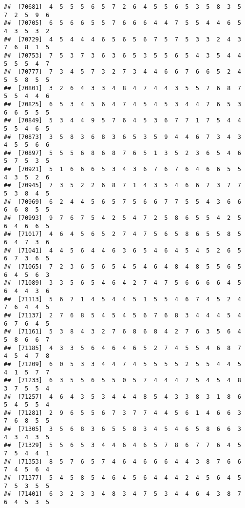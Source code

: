 \documentclass[
]{book}
\begin{document}
\begin{verbatim}
##  [70681]  4  5  5  5  6  5  7  2  6  4  5  5  6  5  3  5  8  3  5  7  2  5  9  6
##  [70705]  6  5  6  6  5  5  7  6  6  6  4  4  7  5  5  4  4  6  5  4  3  5  3  2
##  [70729]  4  5  4  4  4  6  5  6  5  6  7  5  7  5  3  3  2  4  3  7  6  8  1  5
##  [70753]  7  5  3  7  3  6  3  6  5  3  5  5  6  5  4  3  5  4  4  5  5  5  4  7
##  [70777]  7  3  4  5  7  3  2  7  3  4  4  6  6  7  6  6  5  2  4  5  5  8  5  5
##  [70801]  3  2  6  4  3  3  4  8  4  7  4  4  3  5  5  7  6  8  7  5  5  4  4  6
##  [70825]  6  5  3  4  5  6  4  7  4  5  4  5  3  4  4  7  6  5  3  6  6  5  5  5
##  [70849]  5  3  4  4  9  5  7  6  4  5  3  6  7  7  1  7  5  4  4  5  5  4  6  5
##  [70873]  3  5  8  3  6  8  3  6  5  3  5  9  4  4  6  7  3  4  3  4  5  5  6  6
##  [70897]  5  5  5  6  8  6  8  7  6  5  1  3  5  2  3  6  5  4  6  5  7  5  3  5
##  [70921]  5  1  6  6  6  5  3  4  3  6  7  6  7  6  4  6  6  5  5  4  3  5  2  6
##  [70945]  7  3  5  2  2  6  8  7  1  4  3  5  4  6  6  7  3  7  7  5  3  8  4  5
##  [70969]  6  2  4  4  5  6  5  7  5  6  6  7  7  5  5  4  3  6  6  6  6  8  5  5
##  [70993]  9  7  6  7  5  4  2  5  4  7  2  5  8  6  5  5  4  2  5  6  4  6  6  5
##  [71017]  4  6  4  5  6  5  2  7  4  7  5  6  5  8  6  5  5  8  5  6  4  7  3  6
##  [71041]  4  4  5  6  4  4  6  3  6  5  4  6  4  5  4  5  2  6  5  6  7  3  6  5
##  [71065]  7  2  3  6  5  6  5  4  5  4  6  4  8  4  8  5  5  6  5  6  4  5  6  3
##  [71089]  3  3  5  6  5  4  6  4  2  7  4  7  5  6  6  6  6  4  5  6  4  4  3  6
##  [71113]  5  6  7  1  4  5  4  4  5  1  5  5  4  6  7  4  5  2  4  7  6  4  4  5
##  [71137]  2  7  6  8  5  4  5  4  5  6  7  6  8  3  4  4  4  5  4  6  7  6  4  5
##  [71161]  5  3  8  4  3  2  7  6  8  6  8  4  2  7  6  3  5  6  4  5  8  6  6  7
##  [71185]  4  3  3  5  6  4  6  4  6  5  2  7  4  5  5  4  6  8  7  4  5  4  7  8
##  [71209]  6  0  5  3  3  4  4  7  4  5  5  5  5  2  5  5  4  4  5  4  1  5  7  7
##  [71233]  6  3  5  5  6  5  5  0  5  7  4  4  4  7  5  4  5  4  8  3  7  5  5  4
##  [71257]  4  6  4  3  5  3  4  4  4  8  5  4  3  3  8  3  1  8  6  5  4  5  5  4
##  [71281]  2  9  6  5  5  6  7  3  7  7  4  4  5  6  1  4  6  6  3  7  6  8  5  5
##  [71305]  3  5  6  8  3  6  5  5  8  3  4  5  4  6  5  8  6  6  3  4  3  4  3  5
##  [71329]  5  5  6  5  3  4  4  6  4  6  5  7  8  6  7  7  6  4  5  7  5  4  4  1
##  [71353]  8  5  7  6  5  7  4  6  4  6  6  6  4  4  3  8  7  6  6  7  4  5  6  4
##  [71377]  5  4  5  8  5  4  6  4  5  6  4  4  4  2  4  5  6  4  5  7  5  3  5  5
##  [71401]  6  3  2  3  3  4  8  3  4  7  5  3  4  4  6  4  3  8  7  6  4  5  3  5

\end{verbatim}
\end{document}
